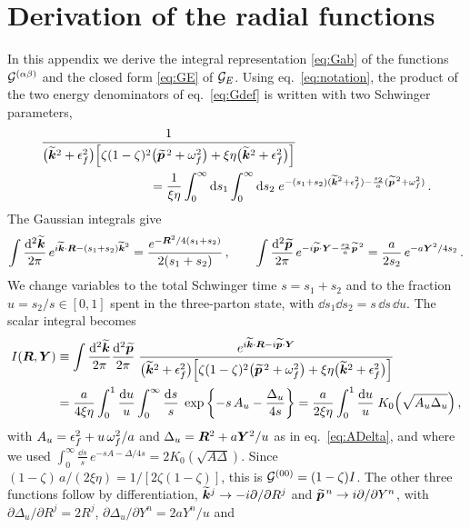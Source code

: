 \section{Derivation of the radial functions}
\label{app:radial}

In this appendix we derive the integral representation \eqref{eq:Gab} of the functions
$\mathcal{G}^{(\alpha\beta)}$ and the closed form \eqref{eq:GE} of $\mathcal{G}_E$. Using eq.~\eqref{eq:notation}, the
product of the two energy denominators of eq.~\eqref{eq:Gdef} is written with two Schwinger parameters,
\begin{align}
&\frac{1}{\big(\kt^2+\ef^2\big)\Big[\zeta(1-\zeta)^2\big(\pt^{\,2}+\of^2\big)+\xi\eta\big(\kt^2+\ef^2\big)\Big]}
\nonumber\\
&\hspace{3cm}=\frac{1}{\xi\eta}\int_0^\infty\dd s_1\int_0^\infty\dd s_2\;
e^{-(s_1+s_2)(\kt^2+\ef^2)-\frac{s_2}{a}(\pt^{\,2}+\of^2)}\,.
\end{align}
The Gaussian integrals give
\begin{equation}
\int\frac{{\rm d}^2\widetilde{\bm{k}}}{2\pi}\,e^{i\widetilde{\bm{k}}\cdot\bm{R}-(s_1+s_2)\widetilde{\bm{k}}^2}=\frac{e^{-\bm{R}^2/4(s_1+s_2)}}{2(s_1+s_2)}\,,\qquad
\int\frac{{\rm d}^2\widetilde{\bm{p}}}{2\pi}\,e^{-i\widetilde{\bm{p}}\cdot\bm{Y}-\frac{s_2}{a}\widetilde{\bm{p}}^{\,2}}=\frac{a}{2s_2}\,e^{-a\bm{Y}^2/4s_2}\,.
\end{equation}
We change variables to the total Schwinger time $s=s_1+s_2$ and to the fraction $u=s_2/s\in[0,1]$ spent
in the three-parton state, with $\dd s_1\dd s_2=s\,\dd s\,\dd u$. The scalar integral becomes
\begin{align}
I(\bm{R},\bm{Y})&\equiv\int\frac{{\rm d}^2\widetilde{\bm{k}}}{2\pi}\frac{{\rm d}^2\widetilde{\bm{p}}}{2\pi}\;
\frac{e^{i\widetilde{\bm{k}}\cdot\bm{R}-i\widetilde{\bm{p}}\cdot\bm{Y}}}{\big(\widetilde{\bm{k}}^2+\epsilon_f^2\big)\Big[\zeta(1-\zeta)^2\big(\widetilde{\bm{p}}^{\,2}+\omega_f^2\big)+\xi\eta\big(\widetilde{\bm{k}}^2+\epsilon_f^2\big)\Big]}
\nonumber\\
&=\frac{a}{4\xi\eta}\int_0^1\frac{{\rm d} u}{u}\int_0^\infty\frac{{\rm d} s}{s}\;
\exp\left\{-s\,A_u-\frac{\Delta_u}{4s}\right\}
=\frac{a}{2\xi\eta}\int_0^1\frac{{\rm d} u}{u}\;K_0\Big(\sqrt{A_u\Delta_u}\Big)\,,
\label{eq:I}
\end{align}
with $A_u=\epsilon_f^2+u\,\omega_f^2/a$ and $\Delta_u=\bm{R}^2+a\bm{Y}^2/u$ as in eq.~\eqref{eq:ADelta}, and where we used
$\int_0^\infty\frac{\dd s}{s}\,e^{-sA-\Delta/4s}=2K_0(\sqrt{A\Delta})$. Since
$(1-\zeta)\,a/(2\xi\eta)=1/[2\zeta(1-\zeta)]$, this is $\mathcal{G}^{(00)}=(1-\zeta)I$. The other three functions
follow by differentiation, $\widetilde{\bm{k}}^j\to-i\partial/\partial R^j$ and $\widetilde{\bm{p}}^{\,n}\to i\partial/\partial Y^n$,
with $\partial\Delta_u/\partial R^j=2R^j$, $\partial\Delta_u/\partial Y^n=2aY^n/u$ and
